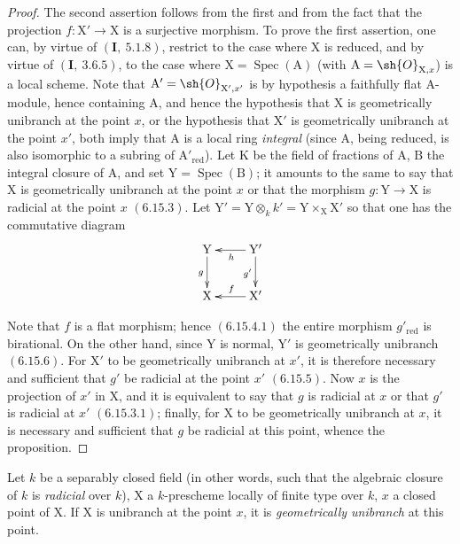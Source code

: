 \begin{proof}
The second assertion follows from the first and from the fact that the projection $f:\mathrm{X}'\to\mathrm{X}$
is a surjective morphism. To prove the first assertion, one can, by virtue of
$(\mathbf{I},~5.1.8)$, restrict to the case where $\mathrm{X}$ is reduced, and by virtue of $(\mathbf{I},~3.6.5)$, to the case
where $\mathrm{X}=\operatorname{Spec}(\mathrm{A})$ (with $\mathrm{A}=\sh{O}_{\mathrm{X},x}$) is a local scheme. Note that $\mathrm{A}'=\sh{O}_{\mathrm{X}',x'}$ is
by hypothesis a faithfully flat $\mathrm{A}$-module, hence containing $\mathrm{A}$, and hence
the hypothesis that $\mathrm{X}$ is geometrically unibranch at the point $x$, or the hypothesis that $\mathrm{X}'$ is
geometrically unibranch at the point $x'$, both imply that $\mathrm{A}$ is a local ring
\emph{integral} (since $\mathrm{A}$, being reduced, is also isomorphic to a subring of $\mathrm{A}'_{\mathrm{red}}$).
Let $\mathrm{K}$ be the field of fractions of $\mathrm{A}$, $\mathrm{B}$ the integral closure of $\mathrm{A}$, and set $\mathrm{Y}=\operatorname{Spec}(\mathrm{B})$;
it amounts to the same to say that $\mathrm{X}$ is geometrically unibranch at the point $x$ or that
the morphism $g:\mathrm{Y}\to\mathrm{X}$ is radicial at the point $x$ $(6.15.3)$. Let $\mathrm{Y}'=\mathrm{Y}\otimes_k k'=\mathrm{Y}\times_\mathrm{X}\mathrm{X}'$
so that one has the commutative diagram
\[
\xymatrix{
  \mathrm{Y} \ar[d]_{g} & \mathrm{Y}' \ar[l]^{h} \ar[d]_{g'} \\
  \mathrm{X} & \mathrm{X}' \ar[l]_{f}
}
\]

Note that $f$ is a flat morphism; hence $(6.15.4.1)$ the entire morphism $g'_{\mathrm{red}}$ is
birational. On the other hand, since $\mathrm{Y}$ is normal, $\mathrm{Y}'$ is geometrically unibranch $(6.15.6)$.
For $\mathrm{X}'$ to be geometrically unibranch at $x'$, it is therefore necessary and sufficient that $g'$
be radicial at the point $x'$ $(6.15.5)$. Now $x$ is the projection of $x'$ in $\mathrm{X}$, and it is equivalent
to say that $g$ is radicial at $x$ or that $g'$ is radicial at $x'$ $(6.15.3.1)$; finally, for $\mathrm{X}$
to be geometrically unibranch at $x$, it is necessary and sufficient that $g$ be radicial at this point,
whence the proposition.
\end{proof}

\begin{lemma}[6.15.8]
\label{IV.6.15.8}
Let $k$ be a separably closed field (in other words, such that the
algebraic closure of $k$ is \emph{radicial} over $k$), $\mathrm{X}$ a $k$-prescheme locally of finite type over $k$,
$x$ a closed point of $\mathrm{X}$. If $\mathrm{X}$ is unibranch at the point $x$, it is \emph{geometrically unibranch} at this point.
\end{lemma}

